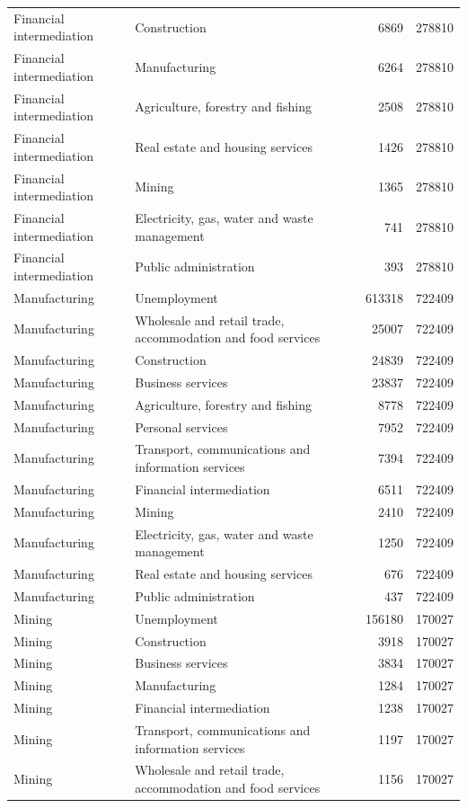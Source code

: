 \begin{longtable}{llrr}
Financial intermediation & Construction & 6869 & 278810 \\
Financial intermediation & Manufacturing & 6264 & 278810 \\
Financial intermediation & Agriculture, forestry and fishing & 2508 & 278810 \\
Financial intermediation & Real estate and housing services & 1426 & 278810 \\
Financial intermediation & Mining & 1365 & 278810 \\
Financial intermediation & Electricity, gas, water and waste management & 741 & 278810 \\
Financial intermediation & Public administration & 393 & 278810 \\
Manufacturing & Unemployment & 613318 & 722409 \\
Manufacturing & Wholesale and retail trade, accommodation and food services & 25007 & 722409 \\
Manufacturing & Construction & 24839 & 722409 \\
Manufacturing & Business services & 23837 & 722409 \\
Manufacturing & Agriculture, forestry and fishing & 8778 & 722409 \\
Manufacturing & Personal services & 7952 & 722409 \\
Manufacturing & Transport, communications and information services & 7394 & 722409 \\
Manufacturing & Financial intermediation & 6511 & 722409 \\
Manufacturing & Mining & 2410 & 722409 \\
Manufacturing & Electricity, gas, water and waste management & 1250 & 722409 \\
Manufacturing & Real estate and housing services & 676 & 722409 \\
Manufacturing & Public administration & 437 & 722409 \\
Mining & Unemployment & 156180 & 170027 \\
Mining & Construction & 3918 & 170027 \\
Mining & Business services & 3834 & 170027 \\
Mining & Manufacturing & 1284 & 170027 \\
Mining & Financial intermediation & 1238 & 170027 \\
Mining & Transport, communications and information services & 1197 & 170027 \\
Mining & Wholesale and retail trade, accommodation and food services & 1156 & 170027 \\

\end{longtable}
